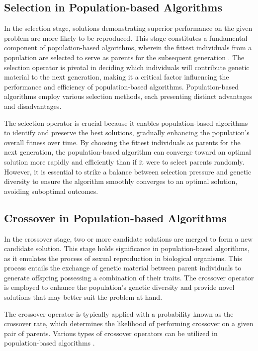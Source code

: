 \documentclass[runningheads]{llncs}
\begin{document}
\subsection{Selection in Population-based Algorithms}

In the selection stage, solutions demonstrating superior performance on the given problem are more likely to be reproduced. This stage constitutes a fundamental component of population-based algorithms, wherein the fittest individuals from a population are selected to serve as parents for the subsequent generation \cite{Miller-1996}. The selection operator is pivotal in deciding which individuals will contribute genetic material to the next generation, making it a critical factor influencing the performance and efficiency of population-based algorithms. Population-based algorithms employ various selection methods, each presenting distinct advantages and disadvantages.

The selection operator is crucial because it enables population-based algorithms to identify and preserve the best solutions, gradually enhancing the population's overall fitness over time. By choosing the fittest individuals as parents for the next generation, the population-based algorithm can converge toward an optimal solution more rapidly and efficiently than if it were to select parents randomly. However, it is essential to strike a balance between selection pressure and genetic diversity to ensure the algorithm smoothly converges to an optimal solution, avoiding suboptimal outcomes.

\subsection{Crossover in Population-based Algorithms}

In the crossover stage, two or more candidate solutions are merged to form a new candidate solution. This stage holds significance in population-based algorithms, as it emulates the process of sexual reproduction in biological organisms. This process entails the exchange of genetic material between parent individuals to generate offspring possessing a combination of their traits. The crossover operator is employed to enhance the population's genetic diversity and provide novel solutions that may better suit the problem at hand.

The crossover operator is typically applied with a probability known as the crossover rate, which determines the likelihood of performing crossover on a given pair of parents. Various types of crossover operators can be utilized in population-based algorithms \cite{Umbarkar-2015}.
\end{document}
